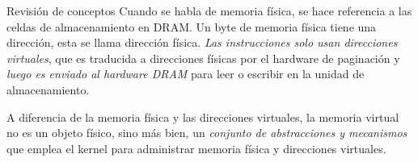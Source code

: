 \documentclass{libs/ufc_format}
\begin{document}
\begin{frame}{Revisión de conceptos}
  Cuando se habla de memoria física, se hace referencia a las celdas de almacenamiento en DRAM. Un byte de memoria física tiene una dirección, esta se llama dirección física. \emph{Las instrucciones solo usan direcciones virtuales}, que es traducida a direcciones físicas por el hardware de paginación y \emph{luego es enviado al hardware DRAM} para leer o escribir en la unidad de almacenamiento.

  \vspace{0.3cm}

  A diferencia de la memoria física y las direcciones virtuales, la memoria virtual no es un objeto físico, sino más bien, un \emph{conjunto de abstracciones y mecanismos} que emplea el kernel para administrar memoria física y direcciones virtuales. \cite{xv6_book}
\end{frame}
\end{document}

